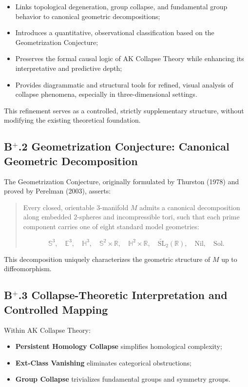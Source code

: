 \documentclass[11pt]{article}
\begin{document}
\begin{itemize}
    \item Links topological degeneration, group collapse, and fundamental group behavior to canonical geometric decompositions;
    \item Introduces a quantitative, observational classification based on the Geometrization Conjecture;
    \item Preserves the formal causal logic of AK Collapse Theory while enhancing its interpretative and predictive depth;
    \item Provides diagrammatic and structural tools for refined, visual analysis of collapse phenomena, especially in three-dimensional settings.
\end{itemize}

This refinement serves as a controlled, strictly supplementary structure, without modifying the existing theoretical foundation.

\subsection*{B$^{+}$.2 Geometrization Conjecture: Canonical Geometric Decomposition}

The Geometrization Conjecture, originally formulated by Thurston (1978) and proved by Perelman (2003), asserts:

\begin{quote}
Every closed, orientable $3$-manifold $M$ admits a canonical decomposition along embedded $2$-spheres and incompressible tori, such that each prime component carries one of eight standard model geometries:

\[
\mathbb{S}^3,\quad \mathbb{E}^3,\quad \mathbb{H}^3,\quad \mathbb{S}^2 \times \mathbb{R},\quad \mathbb{H}^2 \times \mathbb{R},\quad \widetilde{\mathrm{SL}}_2(\mathbb{R}),\quad \mathrm{Nil},\quad \mathrm{Sol}.
\]
\end{quote}

This decomposition uniquely characterizes the geometric structure of $M$ up to diffeomorphism.

\subsection*{B$^{+}$.3 Collapse-Theoretic Interpretation and Controlled Mapping}

Within AK Collapse Theory:

\begin{itemize}
    \item \textbf{Persistent Homology Collapse} simplifies homological complexity;
    \item \textbf{Ext-Class Vanishing} eliminates categorical obstructions;
    \item \textbf{Group Collapse} trivializes fundamental groups and symmetry groups.
\end{itemize}
\end{document}
